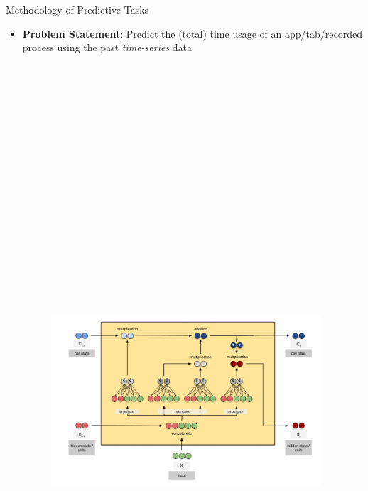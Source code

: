 \documentclass[final]{beamer}
\newlength{\colwidth}
\begin{document}
\begin{frame}[t]
\begin{columns}[t]
\begin{column}{\colwidth}
\begin{exampleblock}{\LARGE{Methodology of Predictive Tasks}}
{          

          \begin{itemize}
            \item \textbf{Problem Statement}: Predict the (total) time usage of an app/tab/recorded process using the past \textit{time-series} data
                  \begin{figure}\includegraphics[width=0.95\textwidth, height=25cm]{lstm_1.png}\end{figure}


\end{itemize}}
\end{exampleblock}
\end{column}
\end{columns}
\end{frame}
\end{document}
